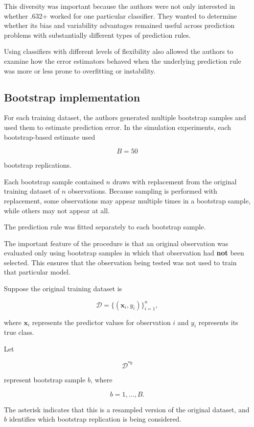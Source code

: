 \documentclass[
  letterpaper,
  DIV=11,
  numbers=noendperiod]{scrreprt}
\begin{document}
This diversity was important because the authors were not only
interested in whether .632+ worked for one particular classifier. They
wanted to determine whether its bias and variability advantages remained
useful across prediction problems with substantially different types of
prediction rules.

Using classifiers with different levels of flexibility also allowed the
authors to examine how the error estimators behaved when the underlying
prediction rule was more or less prone to overfitting or instability.

\subsection{Bootstrap implementation}\label{bootstrap-implementation}

For each training dataset, the authors generated multiple bootstrap
samples and used them to estimate prediction error. In the simulation
experiments, each bootstrap-based estimate used

\[
B = 50
\]

bootstrap replications.

Each bootstrap sample contained \(n\) draws with replacement from the
original training dataset of \(n\) observations. Because sampling is
performed with replacement, some observations may appear multiple times
in a bootstrap sample, while others may not appear at all.

The prediction rule was fitted separately to each bootstrap sample.

The important feature of the procedure is that an original observation
was evaluated only using bootstrap samples in which that observation had
\textbf{not} been selected. This ensures that the observation being
tested was not used to train that particular model.

Suppose the original training dataset is

\[
\mathcal{D}
=
\{(\mathbf{x}_i,y_i)\}_{i=1}^{n},
\]

where \(\mathbf{x}_i\) represents the predictor values for observation
\(i\) and \(y_i\) represents its true class.

Let

\[
\mathcal{D}^{*b}
\]

represent bootstrap sample \(b\), where

\[
b=1,\ldots,B.
\]

The asterisk indicates that this is a resampled version of the original
dataset, and \(b\) identifies which bootstrap replication is being
considered.
\end{document}
